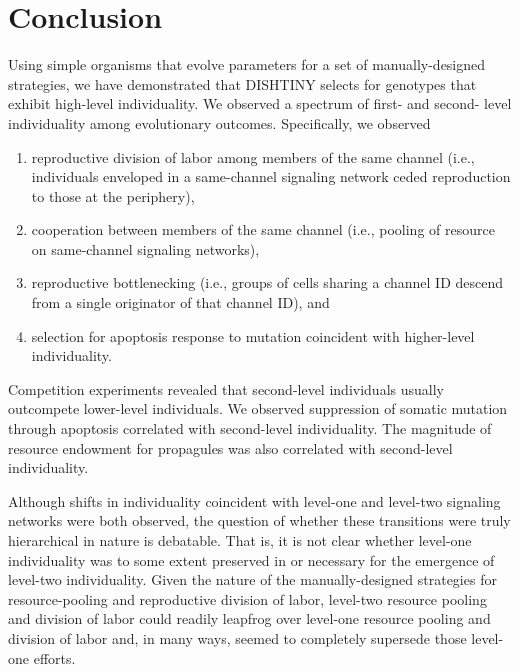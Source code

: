\section{Conclusion}

Using simple organisms that evolve parameters for a set of manually-designed strategies, we have demonstrated that DISHTINY selects for genotypes that exhibit high-level individuality.
We observed a spectrum of first- and second- level individuality among evolutionary outcomes.
Specifically, we observed
\begin{enumerate}
  \item reproductive division of labor among members of the same channel (i.e., individuals enveloped in a same-channel signaling network ceded reproduction to those at the periphery),
  \item cooperation between members of the same channel (i.e., pooling of resource on same-channel signaling networks),
  \item reproductive bottlenecking (i.e., groups of cells sharing a channel ID descend from a single originator of that channel ID), and
  \item selection for apoptosis response to mutation coincident with higher-level individuality.
\end{enumerate}

Competition experiments revealed that second-level individuals usually outcompete lower-level individuals.
We observed suppression of somatic mutation through apoptosis correlated with second-level individuality.
The magnitude of resource endowment for propagules was also correlated with second-level individuality.

Although shifts in individuality coincident with level-one and level-two signaling networks were both observed, the question of whether these transitions were truly hierarchical in nature is debatable.
That is, it is not clear whether level-one individuality was to some extent preserved in or necessary for the emergence of level-two individuality.
Given the nature of the manually-designed strategies for resource-pooling and reproductive division of labor, level-two resource pooling and division of labor could readily leapfrog over level-one resource pooling and division of labor and, in many ways, seemed to completely supersede those level-one efforts.

